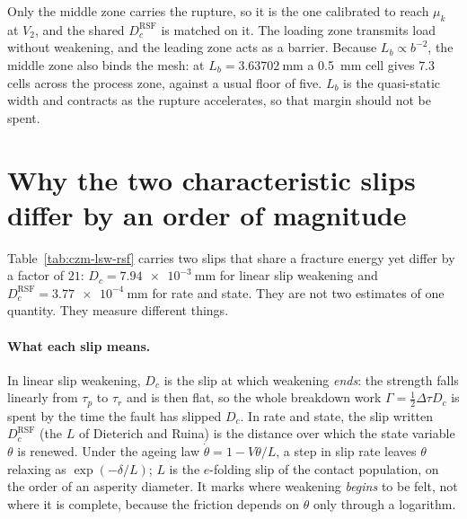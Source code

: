 \documentclass[11pt]{article}
\begin{document}
Only the middle zone carries the rupture, so it is the one calibrated to reach
$\mu_k$ at $V_2$, and the shared $D_c^{\mathrm{RSF}}$ is matched on it. The
loading zone transmits load without weakening, and the leading zone acts as a
barrier. Because $L_b \propto b^{-2}$, the middle zone also binds the mesh: at
$L_b = \SI{3.63702}{\milli\meter}$ a \SI{0.5}{\milli\meter} cell gives $7.3$
cells across the process zone, against a usual floor of five. $L_b$ is the
quasi-static width and contracts as the rupture accelerates, so that margin
should not be spent.

\newpage
\section*{Why the two characteristic slips differ by an order of magnitude}

Table~\ref{tab:czm-lsw-rsf} carries two slips that share a fracture energy yet
differ by a factor of $21$: $D_c = \SI{7.94e-3}{\milli\meter}$ for linear slip
weakening and $D_c^{\mathrm{RSF}} = \SI{3.77e-4}{\milli\meter}$ for rate and
state. They are not two estimates of one quantity. They measure different
things.

\paragraph{What each slip means.}
In linear slip weakening, $D_c$ is the slip at which weakening \emph{ends}: the
strength falls linearly from $\tau_p$ to $\tau_r$ and is then flat, so the whole
breakdown work $\Gamma = \tfrac12\Delta\tau D_c$ is spent by the time the fault
has slipped $D_c$. In rate and state, the slip written $D_c^{\mathrm{RSF}}$ (the
$L$ of Dieterich and Ruina) is the distance over which the state variable
$\theta$ is renewed. Under the ageing law $\dot\theta = 1 - V\theta/L$, a step
in slip rate leaves $\theta$ relaxing as $\exp(-\delta/L)$; $L$ is the
$e$-folding slip of the contact population, on the order of an asperity
diameter. It marks where weakening \emph{begins} to be felt, not where it is
complete, because the friction depends on $\theta$ only through a logarithm.
\end{document}
